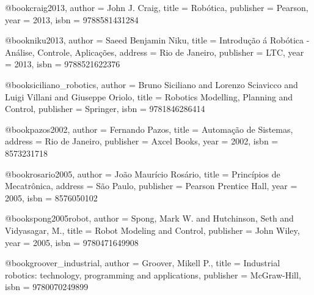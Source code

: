 %
%
%
%
%
%
@book{craig2013,
  author = {John J. Craig},
  title = {Robótica},
  publisher = {Pearson},
  year = {2013},
  isbn = {9788581431284}
}

@book{niku2013,
  author = {Saeed Benjamin Niku},
  title = {Introdução á Robótica - Análise, Controle, Aplicações},
  address = {Rio de Janeiro},
  publisher = {LTC},
  year = {2013},
  isbn = {9788521622376}
}

%
@book{siciliano_robotics,
  author = {Bruno Siciliano and Lorenzo Sciavicco and Luigi Villani and Giuseppe Oriolo},
  title = {Robotics Modelling, Planning and Control},
  publisher = {Springer},
  isbn = {9781846286414}
}

@book{pazos2002,
  author = {Fernando Pazos},
  title = {Automação de Sistemas},
  address = {Rio de Janeiro},
  publisher = {Axcel Books},
  year = {2002},
  isbn = {8573231718}
}

@book{rosario2005,
  author = {João Maurício Rosário},
  title = {Princípios de Mecatrônica},
  address = {São Paulo},
  publisher = {Pearson Prentice Hall},
  year = {2005},
  isbn = {8576050102}%
}


@book{spong2005robot,
  author = {Spong, Mark W. and Hutchinson, Seth and Vidyasagar, M.},
  title = {Robot Modeling and Control},
  publisher = {John Wiley},
  year = {2005},
  isbn = {9780471649908}
}

@book{groover_industrial,
  author = {Groover, Mikell P.},
  title = {Industrial robotics: technology, programming and applications},
  publisher = {McGraw-Hill},
  isbn = {9780070249899}
}



